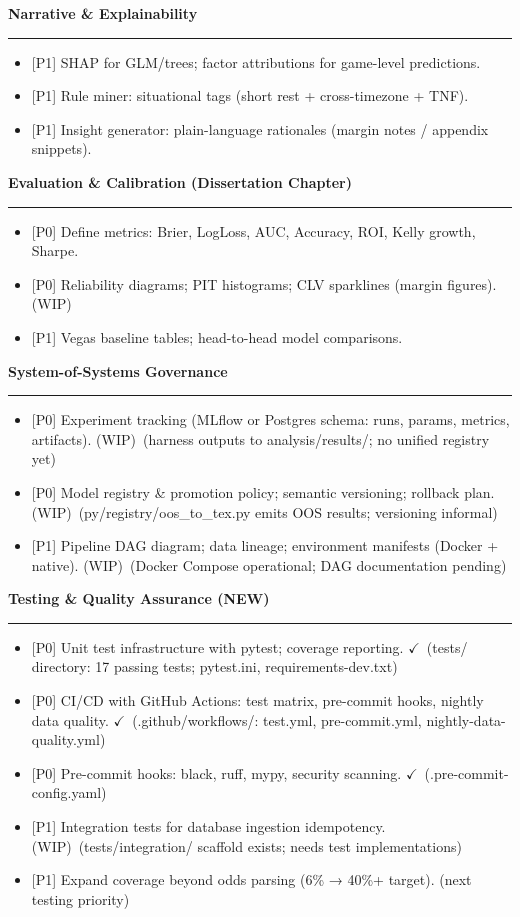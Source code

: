 \documentclass[11pt]{article}
\newcommand{\milestone}[1]{\vspace{0.5em}\noindent\textbf{\large #1}\par\vspace{0.25em}\hrule\vspace{0.5em}}
\newcommand{\done}{\textcolor{green!60!black}{\(\checkmark\)}}
\newcommand{\wip}{\textcolor{orange!80!black}{(WIP)}}
\newcommand{\prio}[1]{\textcolor{blue!70!black}{[#1]}}
\begin{document}
\milestone{Narrative \& Explainability}
\begin{itemize}
  \item \prio{P1} SHAP for GLM/trees; factor attributions for game-level predictions.
  \item \prio{P1} Rule miner: situational tags (short rest + cross-timezone + TNF).
  \item \prio{P1} Insight generator: plain-language rationales (margin notes / appendix snippets).
\end{itemize}

\milestone{Evaluation \& Calibration (Dissertation Chapter)}
\begin{itemize}
  \item \prio{P0} Define metrics: Brier, LogLoss, AUC, Accuracy, ROI, Kelly growth, Sharpe.
  \item \prio{P0} Reliability diagrams; PIT histograms; CLV sparklines (margin figures). \wip
  \item \prio{P1} Vegas baseline tables; head-to-head model comparisons.
\end{itemize}

\milestone{System-of-Systems Governance}
\begin{itemize}
  \item \prio{P0} Experiment tracking (MLflow or Postgres schema: runs, params, metrics, artifacts). \wip\ (harness outputs to analysis/results/; no unified registry yet)
  \item \prio{P0} Model registry \& promotion policy; semantic versioning; rollback plan. \wip\ (py/registry/oos\_to\_tex.py emits OOS results; versioning informal)
  \item \prio{P1} Pipeline DAG diagram; data lineage; environment manifests (Docker + native). \wip\ (Docker Compose operational; DAG documentation pending)
\end{itemize}

\milestone{Testing \& Quality Assurance (NEW)}
\begin{itemize}
  \item \prio{P0} Unit test infrastructure with pytest; coverage reporting. \done\ (tests/ directory: 17 passing tests; pytest.ini, requirements-dev.txt)
  \item \prio{P0} CI/CD with GitHub Actions: test matrix, pre-commit hooks, nightly data quality. \done\ (.github/workflows/: test.yml, pre-commit.yml, nightly-data-quality.yml)
  \item \prio{P0} Pre-commit hooks: black, ruff, mypy, security scanning. \done\ (.pre-commit-config.yaml)
  \item \prio{P1} Integration tests for database ingestion idempotency. \wip\ (tests/integration/ scaffold exists; needs test implementations)
  \item \prio{P1} Expand coverage beyond odds parsing (6\% → 40\%+ target). (next testing priority)
\end{itemize}
\end{document}
